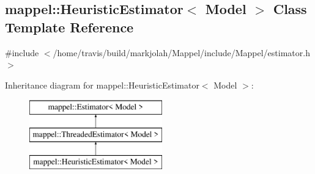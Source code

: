 \hypertarget{classmappel_1_1HeuristicEstimator}{}\subsection{mappel\+:\+:Heuristic\+Estimator$<$ Model $>$ Class Template Reference}
\label{classmappel_1_1HeuristicEstimator}


{\ttfamily \#include $<$/home/travis/build/markjolah/\+Mappel/include/\+Mappel/estimator.\+h$>$}

Inheritance diagram for mappel\+:\+:Heuristic\+Estimator$<$ Model $>$\+:\begin{figure}[H]
\begin{center}
\leavevmode
\includegraphics[height=3.000000cm]{classmappel_1_1HeuristicEstimator}
\end{center}
\end{figure}
